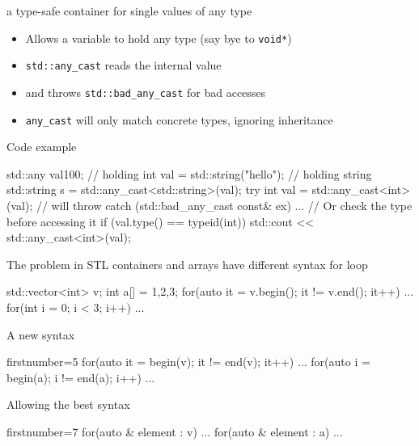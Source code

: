 \begin{frame}[fragile]
  \begin{block}{a type-safe container for single values of any type}
    \begin{itemize}
    \item Allows a variable to hold any type (say bye to \texttt{void*})
    \item \texttt{std::any\_cast} reads the internal value
    \item and throws \texttt{std::bad\_any\_cast} for bad accesses
    \item \texttt{any\_cast} will only match concrete types, ignoring inheritance
    \end{itemize}
  \end{block}
  \begin{exampleblock}{Code example}
    \small
    \begin{cppcode*}{}
      std::any val{100};          // holding int
      val = std::string("hello"); // holding string
      std::string s = std::any_cast<std::string>(val);
      try {
        int val = std::any_cast<int>(val); // will throw
      } catch (std::bad_any_cast const& ex) {...}
      // Or check the type before accessing it
      if (val.type() == typeid(int))
        std::cout << std::any_cast<int>(val);
    \end{cppcode*}
  \end{exampleblock}
\end{frame}

\begin{frame}[fragile]
  \begin{alertblock}{The problem in }
    STL containers and arrays have different syntax for loop
    \vspace{-1mm}
    \begin{cppcode*}{}
      std::vector<int> v;
      int a[] = {1,2,3};
      for(auto it = v.begin(); it != v.end(); it++) {...}
      for(int i = 0; i < 3; i++) {...}
    \end{cppcode*}
  \end{alertblock}
  \pause
  \begin{block}{A new syntax}
    \begin{cppcode*}{firstnumber=5}
      for(auto it = begin(v); it != end(v); it++) {...}
      for(auto i = begin(a); i != end(a); i++) {...}
    \end{cppcode*}
  \end{block}
  \pause
  \begin{exampleblock}{Allowing the best syntax}
    \begin{cppcode*}{firstnumber=7}
      for(auto & element : v) {...}
      for(auto & element : a) {...}
    \end{cppcode*}
  \end{exampleblock}
\end{frame}


